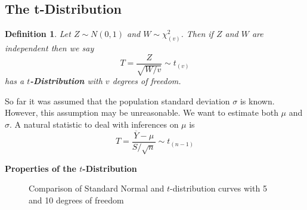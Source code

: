 \documentclass[a4paper,12pt]{article}
\theoremstyle{nonitalic}
\newtheorem{definition}{Definition}[subsection]
\begin{document}
    \newpage

    \subsection{The t-Distribution}

    \begin{definition}
        Let $Z \sim N(0,1)$ and $W \sim \chi^2_{(v)}$. Then if $Z$ and $W$ are independent then we say
        \[
            T = \frac{Z}{\sqrt{W/v}} \sim t_{(v)}
        \]
        has a \textbf{$t$-Distribution} with $v$ degrees of freedom.
    \end{definition}

    So far it was assumed that the population standard deviation $\sigma$ is known. However, this assumption may be unreasonable. We want to estimate both $\mu$ and $\sigma$. A natural statistic to deal with inferences on $\mu$ is
    \[
        T = \frac{\overline{Y} - \mu}{S/\sqrt{n}} \sim t_{(n-1)}
    \]
    
    \textbf{Properties of the $t$-Distribution}
    
    \begin{figure}[h!]
        \centering
        \caption{Comparison of Standard Normal and $t$-distribution curves with 5 and 10 degrees of freedom}
    \end{figure}
\end{document}
